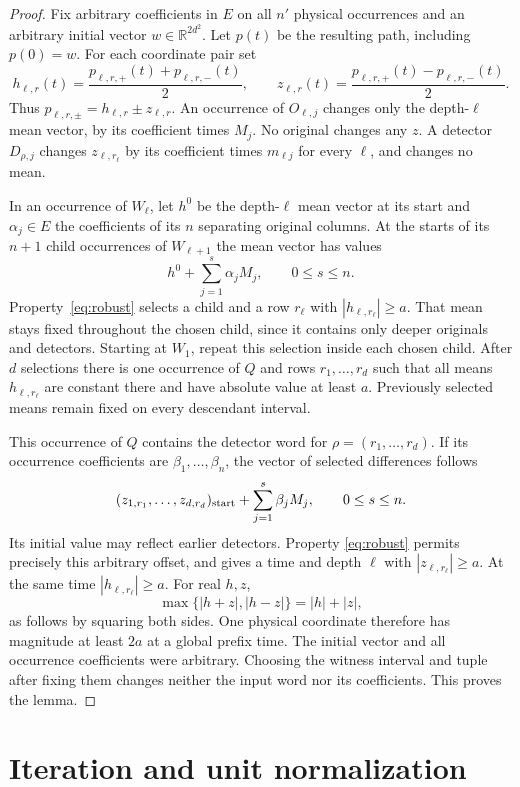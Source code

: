 \documentclass[11pt]{article}
\newcommand{\R}{\mathbb R}
\begin{document}
\begin{proof}
Fix arbitrary coefficients in $E$ on all $n'$ physical occurrences and
an arbitrary initial vector $w\in\R^{2d^2}$. Let $p(t)$ be the resulting
path, including $p(0)=w$. For each coordinate pair set
\[
h_{\ell,r}(t)=\frac{p_{\ell,r,+}(t)+p_{\ell,r,-}(t)}2,
\qquad z_{\ell,r}(t)=\frac{p_{\ell,r,+}(t)-p_{\ell,r,-}(t)}2.
\]
Thus $p_{\ell,r,\pm}=h_{\ell,r}\pm z_{\ell,r}$. An occurrence of
$O_{\ell,j}$ changes only the depth-$\ell$ mean vector, by its
coefficient times $M_j$. No original changes any $z$. A detector
$D_{\rho,j}$ changes $z_{\ell,r_\ell}$ by its coefficient times
$m_{\ell j}$ for every $\ell$, and changes no mean.

In an occurrence of $W_\ell$, let $h^0$ be the depth-$\ell$ mean
vector at its start and $\alpha_j\in E$ the coefficients of its $n$
separating original columns. At the starts of its $n+1$ child occurrences
of $W_{\ell+1}$ the mean vector has values
\[
h^0+\sum_{j=1}^s\alpha_jM_j,\qquad 0\le s\le n.
\]
Property~\eqref{eq:robust} selects a child and a row $r_\ell$ with
$|h_{\ell,r_\ell}|\ge a$. That mean stays fixed throughout the
chosen child, since it contains only deeper originals and detectors.
Starting at $W_1$, repeat this selection inside each chosen child.
After $d$ selections there is one occurrence of $Q$ and rows
$r_1,\ldots,r_d$ such that all means $h_{\ell,r_\ell}$ are constant
there and have absolute value at least $a$. Previously selected means
remain fixed on every descendant interval.

This occurrence of $Q$ contains the detector word for
$\rho=(r_1,\ldots,r_d)$. If its occurrence coefficients are
$\beta_1,\ldots,\beta_n$, the vector of selected differences follows
\[
(z_{1,r_1},\ldots,z_{d,r_d})_{\rm start}
 +\sum_{j=1}^s\beta_jM_j,\qquad 0\le s\le n.
\]
Its initial value may reflect earlier detectors. Property
\eqref{eq:robust} permits precisely this arbitrary offset, and gives a
time and depth $\ell$ with $|z_{\ell,r_\ell}|\ge a$. At the same
time $|h_{\ell,r_\ell}|\ge a$. For real $h,z$,
\[
\max\{|h+z|,|h-z|\}=|h|+|z|,
\]
as follows by squaring both sides. One physical coordinate therefore has
magnitude at least $2a$ at a global prefix time.
The initial vector and all occurrence coefficients were arbitrary.
Choosing the witness interval and tuple after fixing them changes
neither the input word nor its coefficients. This proves the lemma.
\end{proof}

\section{Iteration and unit normalization}
\end{document}
